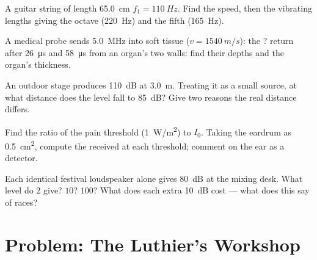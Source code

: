 \begin{exercise}[$\star\star$]\label{exo:g12:sound-acoustics:11}
A guitar string of length \qty{65.0}{cm} 
$f_1 = \qty{110}{Hz}$. Find the  speed, then the vibrating
lengths giving the octave (\qty{220}{Hz}) and the fifth (\qty{165}{Hz}).
\end{exercise}

\begin{exercise}[$\star\star\star$]\label{exo:g12:sound-acoustics:12}
A medical probe sends \qty{5.0}{MHz}  into soft tissue
($v = \qty{1540}{m/s}$): the ?  return after
\qty{26}{\micro s} and \qty{58}{\micro s} from an organ's two walls:
find their depths and the organ's thickness.
\end{exercise}

\begin{exercise}[$\star\star\star$]\label{exo:g12:sound-acoustics:13}
An outdoor stage produces \qty{110}{dB} at \qty{3.0}{m}. Treating it
as a small source, at what distance does the level fall to
\qty{85}{dB}? Give two reasons the real distance differs.
\end{exercise}

\begin{exercise}[$\star\star\star$]\label{exo:g12:sound-acoustics:14}
Find the ratio of the pain threshold (\qty{1}{W/m^2}) to $I_0$.
Taking the eardrum as \qty{0.5}{cm^2}, compute the  received
at each threshold; comment on the ear as a detector.
\end{exercise}

\begin{exercise}[$\star\star\star$]\label{exo:g12:sound-acoustics:15}
Each identical festival loudspeaker alone gives \qty{80}{dB} at the
mixing desk. What level do $2$ give? $10$? $100$? What does each
extra \qty{+10}{dB} cost --- what does this say of  races?
\end{exercise}

\section{Problem: The Luthier's Workshop}

